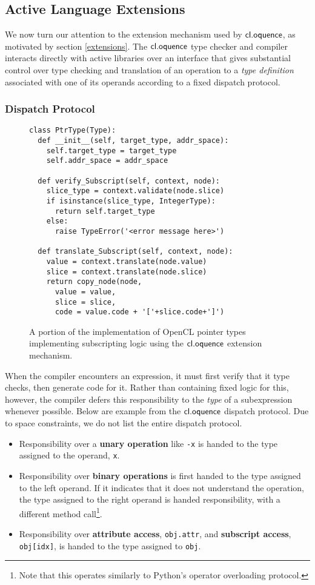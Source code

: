 \documentclass[10pt, conference, compsocconf]{IEEEtran}
\begin{document}
\subsection{Active Language Extensions}
We now turn our attention to the extension mechanism used by $\textsf{cl.oquence}$, as motivated by section \ref{extensions}. The $\textsf{cl.oquence}$ type checker and compiler interacts directly with active libraries over an interface that gives substantial control over type checking and translation of an operation to a {\it type definition} associated with one of its operands according to a fixed dispatch protocol.

\subsubsection{Dispatch Protocol}
\begin{figure}\small{
\begin{verbatim}
class PtrType(Type):
  def __init__(self, target_type, addr_space):
    self.target_type = target_type
    self.addr_space = addr_space
        
  def verify_Subscript(self, context, node):
    slice_type = context.validate(node.slice)
    if isinstance(slice_type, IntegerType):
      return self.target_type
    else: 
      raise TypeError('<error message here>')
       
  def translate_Subscript(self, context, node):
    value = context.translate(node.value)
    slice = context.translate(node.slice)
    return copy_node(node, 
      value = value,
      slice = slice,    
      code = value.code + '['+slice.code+']')
\end{verbatim}}
\caption{A portion of the implementation of OpenCL pointer types implementing subscripting logic using the $\textsf{cl.oquence}$ extension mechanism.}
\label{pointers}
\end{figure}

When the compiler encounters an expression, it must first verify that it type checks, then generate code for it. Rather than containing fixed logic for this, however, the compiler defers this responsibility to the {\it type} of a subexpression whenever possible. Below are example from the $\textsf{cl.oquence}$ dispatch protocol. Due to space constraints, we do not list the entire dispatch protocol.
\begin{itemize}
\item Responsibility over a {\bf unary operation} like \verb|-x| is handed to the type assigned to the operand, \verb|x|.
\item Responsibility over {\bf binary operations} is first handed to the type assigned to the left operand. If it indicates that it does not understand the operation, the type assigned to the right operand is handed responsibility, with a different method call\footnote{Note that this operates similarly to Python's operator overloading protocol.}.
\item Responsibility over {\bf attribute access}, \texttt{obj.attr}, and {\bf subscript access}, \texttt{obj[idx]}, is handed to the type assigned to \texttt{obj}.
\end{itemize}
\end{document}
